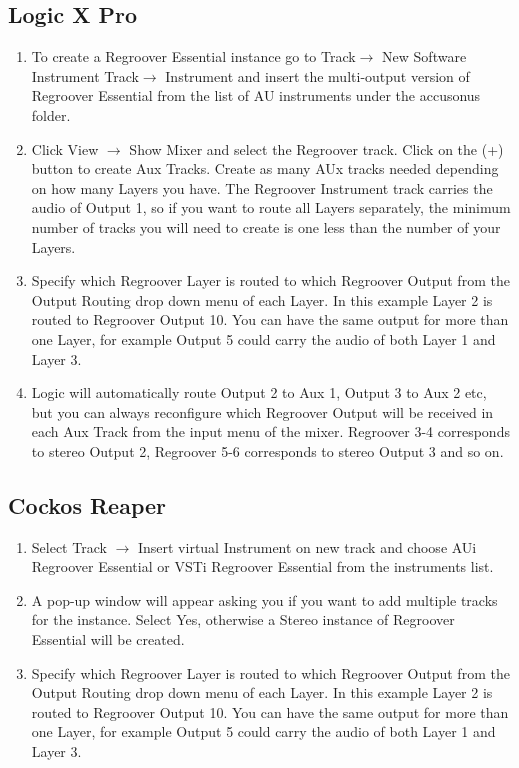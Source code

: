 \documentclass[12pt]{article}
\begin{document}
\subsection*{Logic X Pro}
\begin{enumerate}
\item To create a Regroover Essential instance go to Track$\rightarrow$ New Software Instrument Track$\rightarrow$ Instrument and insert the multi-output version of Regroover Essential from the list of AU instruments under the accusonus folder.
\item Click View $\rightarrow$ Show Mixer and select the Regroover track. Click on the (+) button to create Aux Tracks. Create as many AUx tracks needed depending on how many Layers you have. The Regroover Instrument track carries the audio of Output 1, so if you want to route all Layers separately, the minimum number of tracks you will need to create is one less than the number of your Layers. 
\item Specify which Regroover Layer is routed to which Regroover Output from the Output Routing drop down menu of each Layer. In this example Layer 2 is routed to Regroover Output 10. You can have the same output for more than one Layer, for example Output 5 could carry the audio of both Layer 1 and Layer 3.
\item Logic will automatically route Output 2 to Aux 1, Output 3 to Aux 2 etc, but you can always reconfigure which Regroover Output will be received in each Aux Track from the input menu of the mixer. Regroover 3-4 corresponds to stereo Output 2, Regroover 5-6 corresponds to stereo Output 3 and so on.
\end{enumerate}

\subsection*{Cockos Reaper}
\begin{enumerate}
\item Select Track $\rightarrow$ Insert virtual Instrument on new track and choose AUi Regroover Essential or VSTi Regroover Essential from the instruments list.
\item A pop-up window will appear asking you if you want to add multiple tracks for the instance. Select Yes, otherwise a Stereo instance of Regroover Essential will be created.
\item Specify which Regroover Layer is routed to which Regroover Output from the Output Routing drop down menu of each Layer. In this example Layer 2 is routed to Regroover Output 10. You can have the same output for more than one Layer, for example Output 5 could carry the audio of both Layer 1 and Layer 3.
\end{enumerate}
\end{document}
